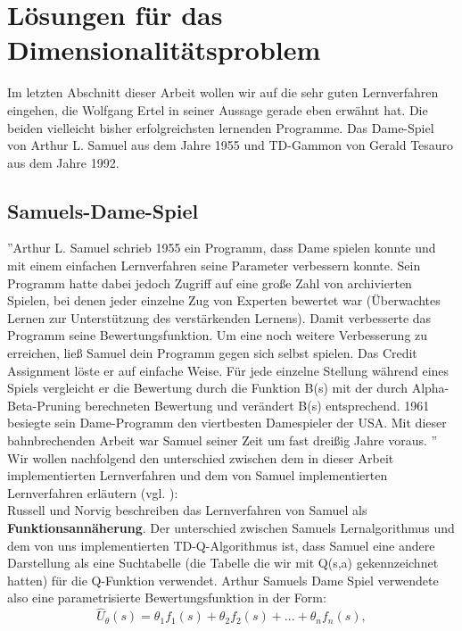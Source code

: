 \section{Lösungen für das Dimensionalitätsproblem}
\label{sec:Ausblick}
Im letzten Abschnitt dieser Arbeit wollen wir auf die sehr guten Lernverfahren eingehen, die Wolfgang Ertel in seiner Aussage gerade eben erwähnt hat. Die beiden vielleicht bisher erfolgreichsten lernenden Programme. Das Dame-Spiel von Arthur L. Samuel aus dem Jahre 1955 und TD-Gammon von Gerald Tesauro aus dem Jahre 1992. 

\subsection{Samuels-Dame-Spiel}
''Arthur L. Samuel schrieb 1955 ein Programm, dass Dame spielen konnte und mit einem einfachen Lernverfahren seine Parameter verbessern konnte. Sein Programm hatte dabei jedoch Zugriff auf eine große Zahl von archivierten Spielen, bei denen jeder einzelne Zug von Experten bewertet war (Überwachtes Lernen zur Unterstützung des verstärkenden Lernens). Damit verbesserte das Programm seine Bewertungsfunktion. Um eine noch weitere Verbesserung zu erreichen, ließ Samuel dein Programm gegen sich selbst spielen. Das Credit Assignment löste er auf einfache Weise. Für jede einzelne Stellung während eines Spiels vergleicht er die Bewertung durch die Funktion B(s) mit der durch Alpha-Beta-Pruning berechneten Bewertung und verändert B(s) entsprechend. 1961 besiegte sein Dame-Programm den viertbesten Damespieler der USA. Mit dieser bahnbrechenden Arbeit war Samuel seiner Zeit um fast dreißig Jahre voraus. \cite[120\psq]{Ertel}''\\

Wir wollen nachfolgend den unterschied zwischen dem in dieser Arbeit implementierten Lernverfahren und dem von Samuel implementierten Lernverfahren erläutern (vgl. \cite[976]{Russell}): \\

Russell und Norvig beschreiben das Lernverfahren von Samuel als \textbf{Funktionsannäherung}. Der unterschied zwischen Samuels Lernalgorithmus und dem von uns implementierten TD-Q-Algorithmus ist, dass Samuel eine andere Darstellung als eine Suchtabelle (die Tabelle die wir mit Q(s,a) gekennzeichnet hatten) für die Q-Funktion verwendet. Arthur Samuels Dame Spiel verwendete also eine parametrisierte Bewertungsfunktion in der Form: \\
\begin{equation*}
\hat{U}_\theta(s) = \theta_1 f_1(s) + \theta_2 f_2(s) + ... + \theta_n f_n(s),
\end{equation*}

